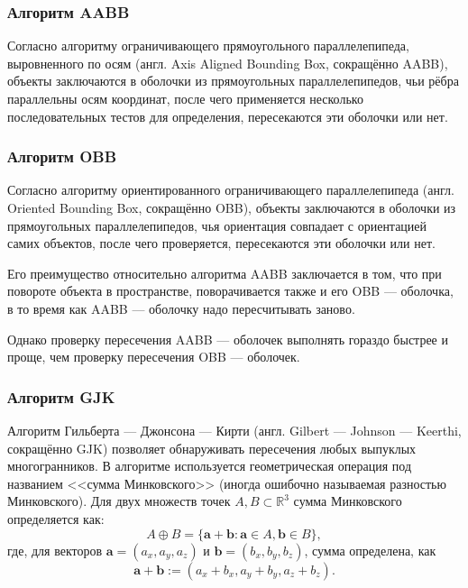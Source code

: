 \subsubsection{Алгоритм AABB}

Согласно алгоритму ограничивающего прямоугольного параллелепипеда, выровненного по осям (англ. Axis Aligned Bounding Box, сокращённо AABB), объекты заключаются в оболочки из прямоугольных параллелепипедов, чьи рёбра параллельны осям координат, после чего применяется несколько последовательных тестов для определения, пересекаются эти оболочки или нет. %

\subsubsection{Алгоритм OBB}

Согласно алгоритму ориентированного ограничивающего параллелепипеда (англ. Oriented Bounding Box, сокращённо OBB), объекты заключаются в оболочки из прямоугольных параллелепипедов, чья ориентация совпадает с ориентацией самих объектов, после чего проверяется, пересекаются эти оболочки или нет. %

Его преимущество относительно алгоритма AABB заключается в том, что при повороте объекта в пространстве, поворачивается также и его OBB --- оболочка, в то время как AABB --- оболочку надо пересчитывать заново.

Однако проверку пересечения AABB --- оболочек выполнять гораздо быстрее и проще, чем проверку пересечения OBB --- оболочек.

\subsubsection{Алгоритм GJK}

Алгоритм Гильберта --- Джонсона --- Кирти (англ. Gilbert --- Johnson --- Keerthi, сокращённо GJK) позволяет обнаруживать пересечения любых выпуклых многогранников.
В алгоритме используется геометрическая операция под названием <<сумма Минковского>> (иногда ошибочно называемая разностью Минковского). %
Для двух множеств точек $A, B \subset \mathbb{R}^3$ сумма Минковского определяется как:
$$
A \oplus B = \{ \boldsymbol{a} + \boldsymbol{b} : \boldsymbol{a} \in A, \boldsymbol{b} \in B \},
$$
где, для векторов $\boldsymbol{a} = (a_x, a_y, a_z)$ и $\boldsymbol{b} = (b_x, b_y, b_z)$, сумма определена, как
$$
\boldsymbol{a} + \boldsymbol{b} := (a_x + b_x, a_y + b_y, a_z + b_z).
$$

